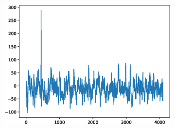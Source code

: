 \documentclass[12pt]{article}
\begin{document}
\begin{figure}
\begin{subfigure}{.25\textwidth}
\end{subfigure}%
\begin{subfigure}{.25\textwidth}
  \centering
  \includegraphics[width=.8\linewidth]{figures/signals/D/F072.eps}
\end{subfigure}


\end{figure}
\end{document}
